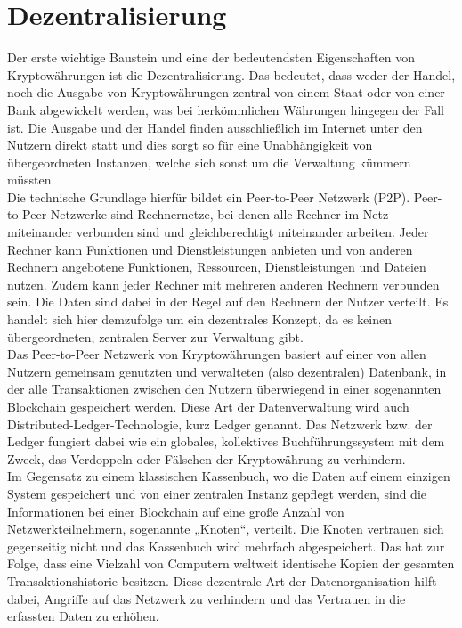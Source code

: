 \documentclass[12pt]{article}
\begin{document}
\section{Dezentralisierung}
Der erste wichtige Baustein und eine der bedeutendsten Eigenschaften von Kryptowährungen ist die Dezentralisierung. Das bedeutet, dass weder der Handel, noch die Ausgabe von Kryptowährungen zentral von einem Staat oder von einer Bank abgewickelt werden, was bei herkömmlichen Währungen hingegen der Fall ist. Die Ausgabe und der Handel finden ausschließlich im Internet unter den Nutzern direkt statt und dies sorgt so für eine Unabhängigkeit von übergeordneten Instanzen, welche sich sonst um die Verwaltung kümmern müssten.\\
Die technische Grundlage hierfür bildet ein Peer-to-Peer Netzwerk (P2P). Peer-to-Peer Netzwerke sind Rechnernetze, bei denen alle Rechner im Netz miteinander verbunden sind und gleichberechtigt miteinander arbeiten. Jeder Rechner kann Funktionen und Dienstleistungen anbieten und von anderen Rechnern angebotene Funktionen, Ressourcen, Dienstleistungen und Dateien nutzen. Zudem kann jeder Rechner mit mehreren anderen Rechnern verbunden sein. Die Daten sind dabei in der Regel auf den Rechnern der Nutzer verteilt. Es handelt sich hier demzufolge um ein dezentrales Konzept, da es keinen übergeordneten, zentralen Server zur Verwaltung gibt.\\
Das Peer-to-Peer Netzwerk von Kryptowährungen basiert auf einer von allen Nutzern gemeinsam genutzten und verwalteten (also dezentralen) Datenbank, in der alle Transaktionen zwischen den Nutzern überwiegend in einer sogenannten Blockchain gespeichert werden. Diese Art der Datenverwaltung wird auch Distributed-Ledger-Technologie, kurz Ledger genannt. Das Netzwerk bzw. der Ledger fungiert dabei wie ein globales, kollektives Buchführungssystem mit dem Zweck, das Verdoppeln oder Fälschen der Kryptowährung zu verhindern.\\
Im Gegensatz zu einem klassischen Kassenbuch, wo die Daten auf einem einzigen System gespeichert und von einer zentralen Instanz gepflegt werden, sind die Informationen bei einer Blockchain auf eine große Anzahl von Netzwerkteilnehmern, sogenannte „Knoten“, verteilt. Die Knoten vertrauen sich gegenseitig nicht und das Kassenbuch wird mehrfach abgespeichert. Das hat zur Folge, dass eine Vielzahl von Computern weltweit identische Kopien der gesamten Transaktionshistorie besitzen. Diese dezentrale Art der Datenorganisation hilft dabei, Angriffe auf das Netzwerk zu verhindern und das Vertrauen in die erfassten Daten zu erhöhen.
\end{document}
